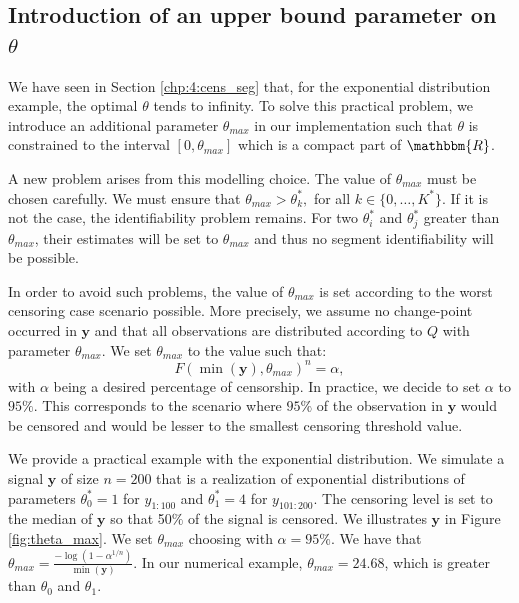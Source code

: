 \subsection{Introduction of an upper bound parameter on $\theta$}

We have seen in Section \ref{chp:4:cens_seg} that, for the exponential distribution example, the optimal $\theta$ tends to infinity. To solve this practical problem, we introduce an additional parameter $\theta_{max}$ in our implementation such that $\theta$ is constrained to the interval $[0,\theta_{max}]$ which is a compact part of $\mathbbm{R}$. 

A new problem arises from this modelling choice. The value of $\theta_{max}$ must be chosen carefully. We must ensure that $\theta_{max}> \theta^*_k,$ for all $k \in \{0,\dots,K^*\}$. If it is not the case, the identifiability problem remains. For two $\theta^*_i$ and $\theta^*_j$  greater than $\theta_{max}$, their estimates will be set to $\theta_{max}$ and thus no segment identifiability will be possible. 

In order to avoid such problems, the value of $\theta_{max}$ is set according to the worst censoring case scenario possible. More precisely, we assume no change-point occurred in $\bm y$ and that all observations are distributed according to $Q$ with parameter $\theta_{max}$. We set $\theta_{max}$ to the value such that: 
\begin{equation}
F(\min(\bm y),\theta_{max})^n = \alpha,
\end{equation}
with $\alpha$ being a desired percentage of censorship. In practice, we decide to set $\alpha$ to $95\%$. This corresponds to the scenario where $95\%$ of the observation in $\bm y$ would be censored and would be lesser to the smallest censoring threshold value. 

We provide a practical example with the exponential distribution. We simulate a signal $\bm y$ of size $n = 200$ that is a realization of exponential distributions of parameters $\theta^*_0 = 1$ for $y_{1:100}$ and $\theta^*_1 = 4$ for $y_{101:200}$. The censoring level is set to the median of $\bm y$ so that 50$\%$ of the signal is censored. We illustrates $\bm y$ in Figure \ref{fig:theta_max}. We set $\theta_{max}$ choosing with $\alpha = 95\%$. We have that $\theta_{max} = \frac{-\log(1-\alpha^{1/n})}{\min(\bm y)}$. In our numerical example, $\theta_{max} = 24.68$, which is greater than $\theta_0$ and $\theta_1$.

